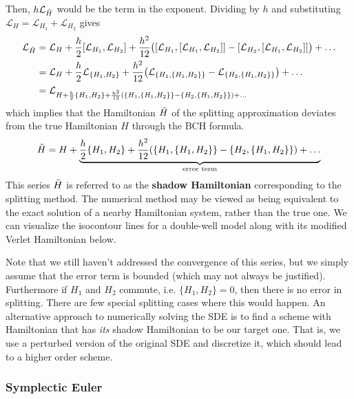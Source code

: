 \documentclass{article}
\begin{document}
      Then, $h \mathcal{L}_{\Tilde{H}}$ would be the term in the exponent. Dividing by $h$ and substituting $\mathcal{L}_H = \mathcal{L}_{H_1} + \mathcal{L}_{H_2}$ gives 
      \begin{align*}
        \mathcal{L}_{\Tilde{H}} & = \mathcal{L}_H + \frac{h}{2} [\mathcal{L}_{H_1}, \mathcal{L}_{H_2}] + \frac{h^2}{12} \big( [\mathcal{L}_{H_1}, [\mathcal{L}_{H_1}, \mathcal{L}_{H_2}]] - [\mathcal{L}_{H_2}, [\mathcal{L}_{H_1}, \mathcal{L}_{H_2}]] \big) + \ldots \\
        & = \mathcal{L}_H + \frac{h}{2} \mathcal{L}_{\{H_1, H_2\}} + \frac{h^2}{12} \big( \mathcal{L}_{\{H_1, \{H_1, H_2\}\}} - \mathcal{L}_{\{H_2, \{H_1, H_2\}\}} \big) + \ldots \\
        & = \mathcal{L}_{H + \frac{h}{2} \{H_1, H_2\} + \frac{h^2}{12} (\{ H_1, \{H_1, H_2\}\} - \{H_2, \{H_1, H_2\}\}) + \ldots} 
      \end{align*}
      which implies that the Hamiltonian $\Tilde{H}$ of the splitting approximation deviates from the true Hamiltonian $H$ through the BCH formula. 
      \begin{equation}
        \Tilde{H} = H + \underbrace{\frac{h}{2} \{H_1, H_2\} + \frac{h^2}{12} (\{ H_1, \{H_1, H_2\}\} - \{H_2, \{H_1, H_2\}\}) + \ldots}_{\text{error term}}
      \end{equation}
      This series $\Tilde{H}$ is referred to as the \textbf{shadow Hamiltonian} corresponding to the splitting method. The numerical method may be viewed as being equivalent to the exact solution of a nearby Hamiltonian system, rather than the true one. We can visualize the isocontour lines for a double-well model along with its modified Verlet Hamiltonian below. 
      \begin{center}
      \end{center}
      Note that we still haven't addressed the convergence of this series, but we simply assume that the error term is bounded (which may not always be justified). Furthermore if $H_1$ and $H_2$ commute, i.e. $\{H_1, H_2\} = 0$, then there is no error in splitting. There are few special splitting cases where this would happen. An alternative approach to numerically solving the SDE is to find a scheme with Hamiltonian that has \textit{its} shadow Hamiltonian to be our target one. That is, we use a perturbed version of the original SDE and discretize it, which should lead to a higher order scheme. 

    \subsubsection{Symplectic Euler}
\end{document}
